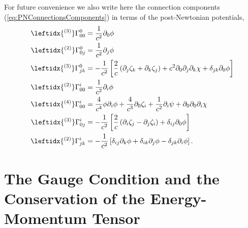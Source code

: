 For future convenience  we also write here the connection components (\ref{eq:PNConnectionsComponents}) in terms of the post-Newtonian potentials,
\begin{subequations} 
\begin{align}
\leftidx{^{(3)}}\Gamma ^0_{00} &=  \frac{1}{c^2} \partial _0 \phi\\
\leftidx{^{(2)}}\Gamma ^0_{0j} &=  \frac{1}{c^2} \partial _j \phi \\
\leftidx{^{(3)}}\Gamma ^0_{jk} &=  -\frac{1}{c^2} \left[ \frac{2}{c}\left( \partial _j \zeta_k + \partial _k \zeta_j \right) + c^2 \partial_0 \partial_j \partial_k \chi + \delta_{jk} \partial _0 \phi \right] \\
\leftidx{^{(2)}}\Gamma ^i_{00} &=  \frac{1}{c^2} \partial _i \phi \\
\leftidx{^{(4)}}\Gamma ^i_{00} &=  \frac{4}{c^4} \phi \partial _i \phi + \frac{4}{c^3} \partial _0 \zeta_i + \frac{1}{c^2} \partial _i \psi + \partial_0 \partial_0 \partial_i \chi \\
\leftidx{^{(3)}}\Gamma ^i_{0j} &= - \frac{1}{c^2} \left[ \frac{2}{c}\left( \partial _i \zeta_j - \partial _j \zeta_i \right) + \delta_{ij} \partial _0 \phi \right]\\
\leftidx{^{(2)}}\Gamma ^i_{jk} &= - \frac{1}{c^2} \left[ \delta_{ij}\partial _k \phi  + \delta_{ik} \partial _j \phi - \delta_{jk}  \partial _i \phi \right].
\end{align}
\end{subequations}

\section{The Gauge Condition and the Conservation of the Energy-Momentum Tensor}

